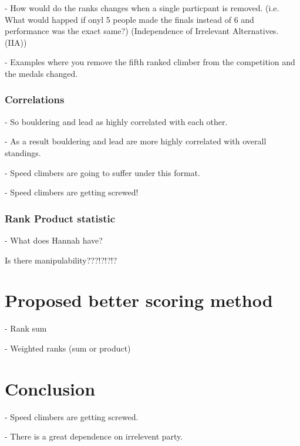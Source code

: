 \documentclass{article}\usepackage[]{graphicx}\usepackage[]{color}
\begin{document}
- How would do the ranks changes when a single particpant is removed.  (i.e. What would happed if onyl 5 people made the finals instead of 6 and performance was the exact same?) (Independence of Irrelevant Alternatives.  (IIA))

- Examples where you remove the fifth ranked climber from the competition and the medals changed. 

\subsubsection{Correlations}

- So bouldering and lead as highly correlated with each other. 

- As a result bouldering and lead are more highly correlated with overall standings.  

- Speed climbers are going to suffer under this format.  

- Speed climbers are getting screwed!

\subsubsection{Rank Product statistic}

- What does Hannah have?

Is there manipulability???!?!?!?

% 

\section{Proposed better scoring method}

- Rank sum

- Weighted ranks (sum or product)

\section{Conclusion}

- Speed climbers are getting screwed.  

- There is a great dependence on irrelevent party. 




\end{document}
